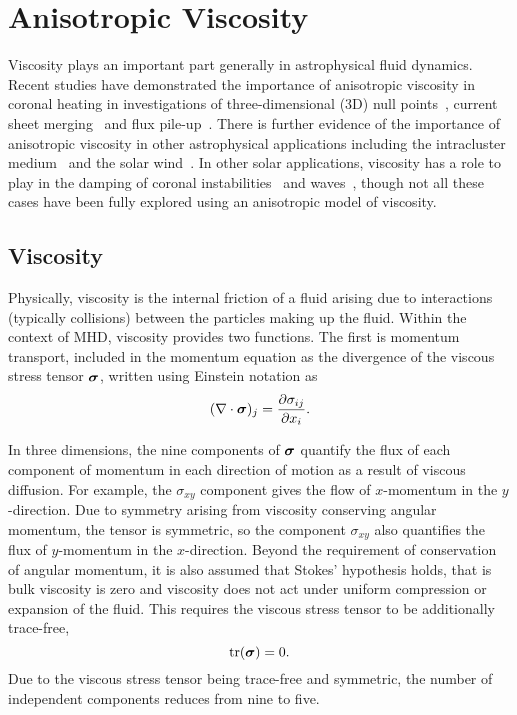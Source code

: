 \section{Anisotropic Viscosity}

Viscosity plays an important part generally in astrophysical fluid dynamics. Recent studies have demonstrated the importance of anisotropic viscosity in coronal heating in investigations of three-dimensional (3D) null points~\cite{craigViscousDissipation3D2013}, current sheet merging~\cite{armstrongViscoResistiveDissipation2013} and flux pile-up~\cite{litvinenkoViscousEnergyDissipation2005}. There is further evidence of the importance of anisotropic viscosity in other astrophysical applications including the intracluster medium~\cite{zuhoneEffectAnisotropicViscosity2014, parrishEffectsAnisotropicViscosity2012a} and the solar wind~\cite{baleMagneticFluctuationPower2009}. In other solar applications, viscosity has a role to play in the damping of coronal instabilities~\cite{howsonEffectsResistivityViscosity2017} and waves~\cite{vranjesViscosityEffectsWaves2014, erdelyiResonantAbsorptionAlfven1995a, rudermanSlowSurfaceWave2000a}, though not all these cases have been fully explored using an anisotropic model of viscosity.

\subsection{Viscosity}

Physically, viscosity is the internal friction of a fluid arising due to interactions (typically collisions) between the particles making up the fluid. Within the context of MHD, viscosity provides two functions. The first is momentum transport, included in the momentum equation as the divergence of the viscous stress tensor ${\bm \sigma}$, written using Einstein notation as
\begin{equation}
  \label{eq:viscous_momenum_transport}
  (\nabla \cdot {\bm \sigma})_j = \frac{\partial \sigma_{ij}}{\partial x_i}.
\end{equation}

In three dimensions, the nine components of ${\bm \sigma}$ quantify the flux of each component of momentum in each direction of motion as a result of viscous diffusion. For example, the $\sigma_{xy}$ component gives the flow of $x$-momentum in the $y$-direction. Due to symmetry arising from viscosity conserving angular momentum, the tensor is symmetric, so the component $\sigma_{xy}$ also quantifies the flux of $y$-momentum in the $x$-direction. Beyond the requirement of conservation of angular momentum, it is also assumed that Stokes' hypothesis holds, that is bulk viscosity is zero and viscosity does not act under uniform compression or expansion of the fluid. This requires the viscous stress tensor to be additionally trace-free,
\begin{equation}
  \label{eq:trace_free_tensor}
  \text{tr}({\bm \sigma}) = 0.
\end{equation}
Due to the viscous stress tensor being trace-free and symmetric, the number of independent components reduces from nine to five.

